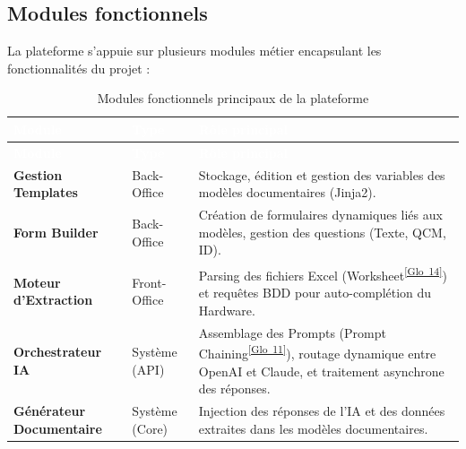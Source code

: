 \documentclass[12pt, a4paper]{report}
\newcommand{\gloref}[1]{\textsuperscript{\hyperlink{glo:#1}{[Glo~#1]}}}
\begin{document}
\subsection{Modules fonctionnels}
La plateforme s’appuie sur plusieurs modules métier encapsulant les fonctionnalités du projet :

\begin{longtable}{|p{3.5cm}|p{3cm}|p{\dimexpr\textwidth-7.3cm}|}
    \hline
    \rowcolor{SecColor}
    \textcolor{white}{\textbf{Module}} & \textcolor{white}{\textbf{Type}} & \textcolor{white}{\textbf{Rôle principal}} \\ \hline
    \endfirsthead

    \hline
    \rowcolor{SecColor}
    \textcolor{white}{\textbf{Module}} & \textcolor{white}{\textbf{Type}} & \textcolor{white}{\textbf{Rôle principal}} \\ \hline
    \endhead

    \hline
    \endfoot

    \hline
    \caption{Modules fonctionnels principaux de la plateforme} 
    \label{tab:modules_fonctionnels}
    \endlastfoot

    \textbf{Gestion Templates} & Back-Office & Stockage, édition et gestion des variables des modèles documentaires (Jinja2). \\ \hline
    
    \textbf{Form Builder} & Back-Office & Création de formulaires dynamiques liés aux modèles, gestion des questions (Texte, QCM, ID). \\ \hline
    
    \textbf{Moteur d'Extraction} & Front-Office & Parsing des fichiers Excel (Worksheet\gloref{14}) et requêtes BDD pour auto-complétion du Hardware. \\ \hline
    
    \textbf{Orchestrateur IA} & Système (API) & Assemblage des Prompts (Prompt Chaining\gloref{11}), routage dynamique entre OpenAI et Claude, et traitement asynchrone des réponses. \\ \hline
    
    \textbf{Générateur Documentaire} & Système (Core) & Injection des réponses de l'IA et des données extraites dans les modèles documentaires. \\ 
\end{longtable}
\end{document}
